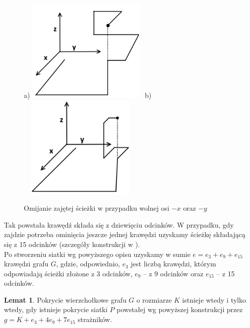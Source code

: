 \documentclass[brudnopis]{xmgr}
\theoremstyle{definition}
\newtheorem{Lemat}{Lemat}
\begin{document}
\begin{figure}[ht!]
  \centering
  a)\includegraphics[width=6cm,height=5cm]{rysunki/zajete_z.png}
  b)\includegraphics[width=6cm,height=5cm]{rysunki/zajete_z2.png}
  \caption{Omijanie zajętej ścieżki w przypadku wolnej osi $-x$ oraz $-y$}
  \label{fig:nakladanie}
\end{figure} 

Tak powstała krawędź składa się z dziewięciu odcinków. W przypadku, gdy zajdzie potrzeba ominięcia jeszcze jednej krawędzi uzyskamy ścieżkę składającą się z 15 odcinków (szczegóły konstrukcji w \cite{ntafos} ).
\\\indent Po stworzeniu siatki wg powyższego opisu uzyskamy w sumie $e = e_3 + e_9 + e_{15}$ krawędzi grafu $G$, gdzie, odpowiednio, $e_3$  jest liczbą krawędzi, którym odpowiadają ścieżki złożone z 3 odcinków, $e_9$ -- z 9 odcinków oraz $e_{15}$ -- z 15 odcinków.

\begin{Lemat}\cite{orourke}
	Pokrycie wierzchołkowe grafu $G$ o rozmiarze $K$ istnieje wtedy i tylko wtedy, gdy istnieje pokrycie siatki $P$ powstałej wg powyższej konstrukcji przez $g = K + e_3 + 4e_9 + 7e_{15}$ strażników.
\end{Lemat}
\end{document}
